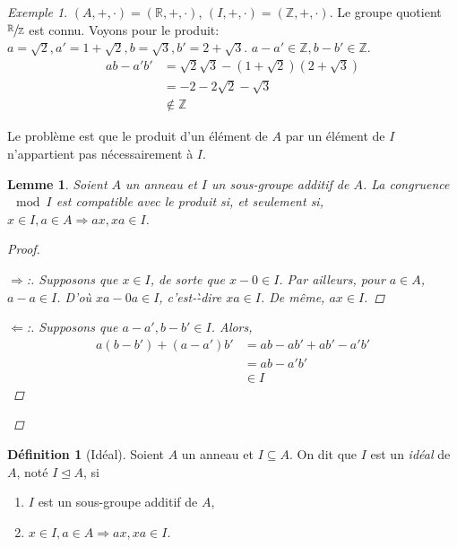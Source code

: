\documentclass{report}
\newtheorem*{lem}{Lemme}
\theoremstyle{definition}
\newtheorem*{dfn}{D\'efinition}
\theoremstyle{remark}
\newtheorem*{exem}{Exemple}
\newenvironment*{subproof}[1][D\'emonstration]
{
\begin{proof}[#1]

}
{
\renewcommand{\qedsymbol}{$\blacksquare$}
\end{proof}
\renewcommand{\qedsymbol}{$\square$}
}
\def\ZZ{\mathbb{Z}}
\def\RR{\mathbb{R}}
\begin{document}
	\begin{exem}
		$(A,+,\cdot) = (\RR,+,\cdot)$, $(I,+,\cdot) = (\ZZ,+,\cdot)$. Le groupe quotient $\sfrac{\RR}{\ZZ}$ est connu. Voyons pour le produit: $a=\sqrt{2}, a'=1+\sqrt{2}, b=\sqrt{3}, b'=2+\sqrt{3}$. $a-a' \in \ZZ, b-b' \in \ZZ$.
		\begin{align*}
			ab-a'b'&= \sqrt{2}\sqrt{3}-(1+\sqrt{2})(2+\sqrt{3})\\
			&= -2-2\sqrt{2}-\sqrt{3}\\
			&\notin\ZZ
		\end{align*}

		Le probl\`eme est que le produit d'un \'el\'ement de $A$ par un \'el\'ement de $I$ n'appartient pas n\'ecessairement \`a $I$.
	\end{exem}

	\begin{lem}
		Soient $A$ un anneau et $I$ un sous-groupe additif de $A$. La congruence$\mod I$ est compatible avec le produit si, et seulement si, $x \in I, a \in A \Rightarrow ax,xa \in I$.
		\begin{proof}
			\begin{subproof}[$\Rightarrow$:]
				Supposons que $x \in I$, de sorte que $x-0 \in I$. Par ailleurs, pour $a \in A$, $a-a \in I$. D'o\`u $xa-0a \in I$, c'est-\`-dire $xa \in I$. De m\^eme, $ax \in I$.
			\end{subproof}
			\begin{subproof}[$\Leftarrow$:]
				Supposons que $a-a', b-b' \in I$. Alors,
				\begin{align*}
					a(b-b') + (a-a')b'&=  ab-ab'+ab'-a'b'\\
					&= ab-a'b'\\
					&\in I
				\end{align*}
			\end{subproof}
		\end{proof}
	\end{lem}

	\begin{dfn}[Id\'eal]
		Soient $A$ un anneau et $I \subseteq A$. On dit que $I$ est un \emph{id\'eal} de $A$, not\'e $I \trianglelefteq A$, si
		\begin{enumerate}
			\item $I$ est un sous-groupe additif de $A$,
			\item $x \in I, a \in A \Rightarrow ax,xa \in I$.
		\end{enumerate}
	\end{dfn}
\end{document}
